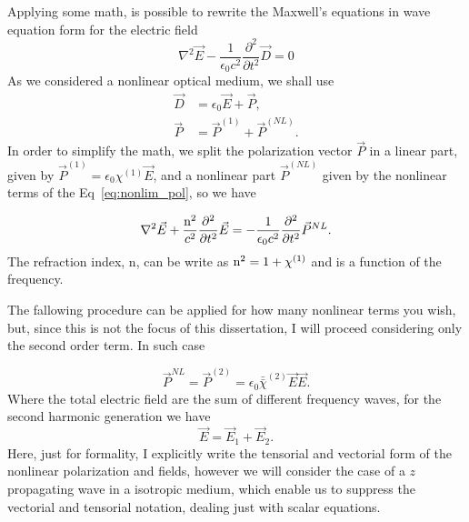 %
Applying some math, is possible to rewrite the Maxwell's equations in wave equation form for the electric field 
\begin{equation}
    \nabla^2\vec{E} - \frac{1}{\epsilon_0 c^2}\frac{\partial^2}{\partial t^2}\vec{D} = 0
\end{equation}
As we considered a nonlinear optical medium, we shall use
\begin{subequations}
    \begin{align}
        \vec{D} &= \epsilon_0\vec{E} +\vec{P},\\
        \vec{P} &= \vec{P}^{(1)} + \vec{P}^{(NL)}.
    \end{align}
\end{subequations}
In order to simplify the math, we split the polarization vector $\vec{P}$ in a linear part, given by $\vec{P}^{(1)} = \epsilon_0\chi^{(1)}\vec{E}$, and a nonlinear part $\vec{P}^{(NL)}$ given by the nonlinear terms of the Eq~\ref{eq:nonlim_pol}, so we have

\begin{equation}
    \nabla^2\vec{E} +\frac{\text{n}^2}{c^2}\frac{\partial^2}{\partial t^2}\vec{E} = -\frac{1}{\epsilon_0 c^2} \frac{\partial^2}{\partial t^2}\vec{P}^{NL}.
    \label{eq:wave_equation_nonlinear}
\end{equation}
The refraction index, n, can be write as $\text{n}^2= 1 + \chi^{(1)}$ and is a function of the frequency.

The fallowing procedure can be applied for how many nonlinear terms you wish, but, since this is not the focus of this dissertation, I will proceed considering only the second order term. In such case

\begin{equation}
    \vec{P}^{NL} = \vec{P}^{(2)} = \epsilon_0\bar{\bar{\chi}}^{(2)}\vec{E}\vec{E}.
    \label{eq:nonlinear_polarization}
\end{equation}
Where the total electric field are the sum of different frequency waves, for the second harmonic generation we have
\begin{equation}
    \vec{E} = \vec{E}_1 + \vec{E}_2.
    \label{eq:total_field}
\end{equation}
Here, just for formality, I explicitly write the tensorial and vectorial form of the nonlinear polarization and fields, however we will consider the case of a $z$ propagating wave in a isotropic medium, which enable us to suppress the vectorial and tensorial notation, dealing just with scalar equations.

